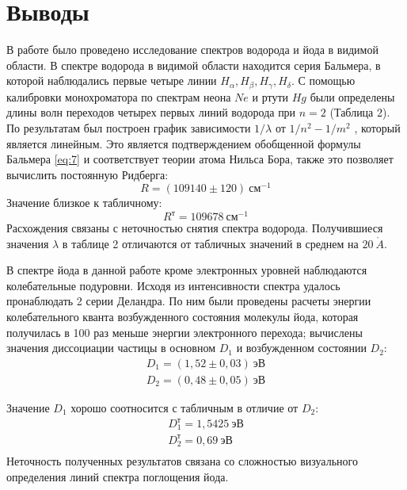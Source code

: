 \documentclass[a4paper, 12pt]{article}
\begin{document}
\section{Выводы}
В работе было проведено исследование спектров водорода и йода в
видимой области. В спектре водорода в видимой области находится серия
Бальмера, в которой наблюдались первые четыре линии $H_\alpha,
H_\beta, H_\gamma, H_\delta$. С помощью калибровки монохроматора по
спектрам неона $N\! e$ и ртути $H\! g$  были определены длины волн
переходов четырех первых линий водорода при $n = 2$ (Таблица 2). По результатам
был построен график зависимости $1/\lambda$ от $1/n^2-1/m^2$
, который является линейным. Это является подтверждением
обобщенной формулы Бальмера \eqref{eq:7} и соответствует теории атома
Нильса Бора, также это позволяет вычислить
постоянную Ридберга:
\[
    R = (109140 \pm 120) \: \text{см}^{-1}
\]
Значение близкое к табличному:
\[
    R^\text{т} = 109678 \: \text{см}^{-1}
\]
Расхождения связаны с неточностью снятия спектра водорода.
Получившиеся значения $\lambda$ в таблице 2 отличаются от табличных
значений в среднем на $20\: \mathring{A}$.

В спектре йода в данной работе кроме электронных уровней наблюдаются
колебательные подуровни. Исходя из интенсивности спектра удалось
пронаблюдать 2 серии Деландра. По ним были проведены расчеты энергии
колебательного кванта возбужденного состояния молекулы йода, которая
получилась в 100 раз меньше энергии электронного перехода; вычислены
значения диссоциации частицы в основном $D_1$ и возбужденном состоянии
$D_2$:
\begin{equation*}
    \begin{gathered}
        D_1  = (1,52 \pm 0,03)\: \text{эВ}\\
        D_2  = (0,48 \pm 0,05)\:
        \text{эВ}
    \end{gathered}
\end{equation*}

Значение $D_1$ хорошо соотносится с табличным в отличие от $D_2$:
\begin{equation*}
    \begin{gathered}
        D_1 ^{\text{т}}  = 1,5425\: \text{эВ}\\
        D_2 ^{\text{т}}  = 0,69\: \text{эВ}\\
    \end{gathered}
\end{equation*}
Неточность полученных результатов связана со сложностью визуального
определения
линий спектра поглощения йода.
\end{document}

